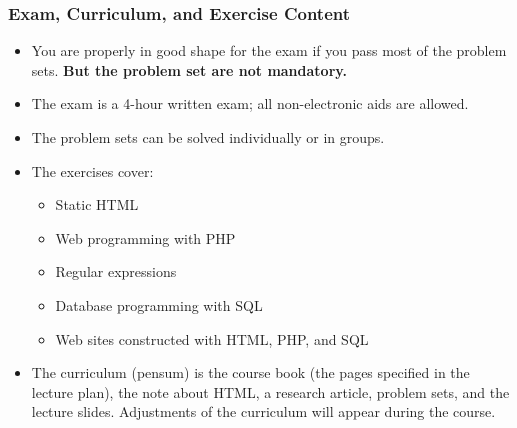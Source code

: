 \documentclass[dvipsnames]{beamer}
\begin{document}
\begin{frame}
\frametitle{Exam, Curriculum, and Exercise Content}

\begin{itemize}
\item You are properly in good shape for the exam if you pass most of the
  problem sets. \textbf{But the problem set are not mandatory.}
\item The exam is a 4-hour written exam; all non-electronic 
  aids are allowed.
\item The problem sets can be solved individually or in groups.
\item The exercises cover:
  \begin{itemize}
  \item Static HTML
  \item Web programming with PHP
  \item Regular expressions
  \item Database programming with SQL
  \item Web sites constructed with HTML, PHP, and SQL
  \end{itemize}
\item The curriculum (pensum) is the course book (the pages specified
  in the lecture plan), the note about HTML, a research article,
  problem sets, and the lecture slides. Adjustments of the curriculum
  will appear during the course.
\end{itemize}

\end{frame}
\end{document}

